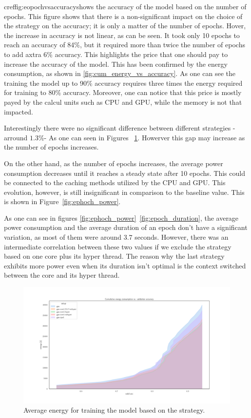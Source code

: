 cref{fig:eopochvsaccuracy}shows the accuracy of the model based on the number of epochs. This figure shows that there is a non-significant impact on the choice of the strategy on the accuracy; it is only a matter of the number of epochs. Hover, the increase in accuracy is not linear, as can be seen. It took only 10 epochs to reach an accuracy of 84\%, but it required more than twice the number of epochs to add axtra 6\% accuracy. This highlights the price that one should pay to increase the accuracy of the model. This has been confirmed by the energy consumption, as shown in \cref{fig:cum_energy_vs_accuracy}.
As one can see the training the model up to 90\% accuracy requires three times the energy required for training to 80\% accuracy. Moreover, one can notice that this price is mostly payed by the calcul units such as CPU and GPU, while the memory is not that impacted.

Interestingly there were no significant difference between different strategies -arround $1.3\%$- As one can seen in Figures ~\ref{fig:av_energy_setup}. Howerver this gap may increase as the number of epochs increases.

On the other hand, as the number of epochs increases, the average power consumption decreases until it reaches a steady state after 10 epochs. This could be connected to the caching methods utilized by the CPU and GPU. This evolution, however, is still insignificant in comparison to the baseline value. This is shown in Figure~\ref{fig:ephoch_power}.

As one can see in figures \ref{fig:ephoch_power}~\ref{fig:epoch_duration}, the average power consumption and the average duration of an epoch don't have a significant variation, as most of them were around 3.7 seconds. However, there was an intermediate correlation between these two values if we exclude the strategy based on one core plus its hyper thread. The reason why the last strategy exhibits more power even when its duration isn't optimal is the context switched between the core and its hyper thread.



\begin{figure}
    \centering
    \includegraphics[width=\linewidth]{imgs/cumulative_energy_fast10.pdf}
    \caption{Average energy for training the model based on the strategy.}
    \label{fig:av_energy_setup}
\end{figure}


